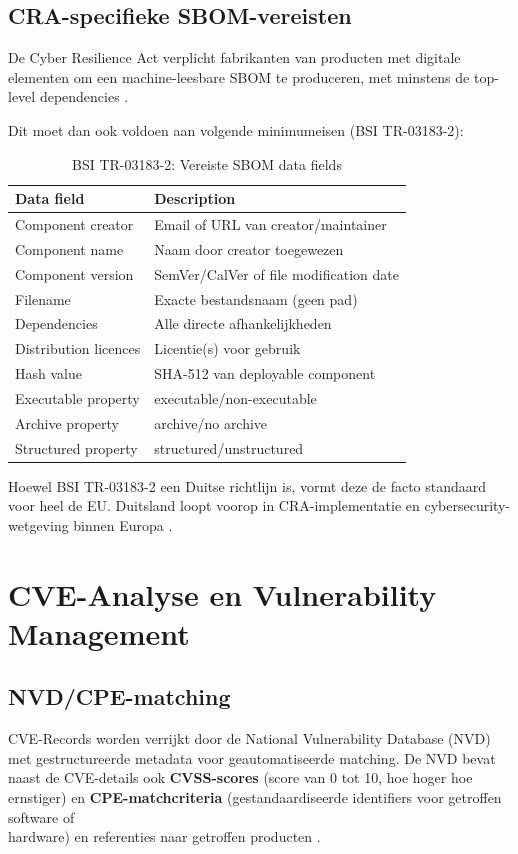 \subsection{CRA-specifieke SBOM-vereisten}

De Cyber Resilience Act verplicht fabrikanten van producten met digitale elementen om een machine-leesbare SBOM te produceren, met minstens de top-level dependencies \autocite{EU_CRA}.

Dit moet dan ook voldoen aan volgende minimumeisen (BSI TR-03183-2):
\begin{table}[H]
  \centering
  \caption{BSI TR-03183-2: Vereiste SBOM data fields \autocite{BSI2025}}
  \begin{tabular}{|p{4.2cm}|p{8cm}|}
    \hline
    \textbf{Data field} & \textbf{Description} \\
    \hline
    Component creator & Email of URL van creator/maintainer \\
    Component name & Naam door creator toegewezen \\
    Component version & SemVer/CalVer of file modification date \\
    Filename & Exacte bestandsnaam (geen pad) \\
    Dependencies & Alle directe afhankelijkheden \\
    Distribution licences & Licentie(s) voor gebruik \\
    Hash value & SHA-512 van deployable component \\
    Executable property & executable/non-executable \\
    Archive property & archive/no archive \\
    Structured property & structured/unstructured \\
    \hline
  \end{tabular}
  \label{tab:cra-sbom-fields}
\end{table}
  
Hoewel BSI TR-03183-2 een Duitse richtlijn is, vormt deze de facto standaard voor heel de EU. Duitsland loopt voorop in CRA-implementatie en cybersecurity-\\wetgeving binnen Europa \autocite{Robyn2025}.

\section{CVE-Analyse en Vulnerability Management}
\subsection{NVD/CPE-matching}
CVE-Records worden verrijkt door de National Vulnerability Database (NVD) met gestructureerde metadata voor geautomatiseerde matching. De NVD bevat naast de CVE-details ook \textbf{CVSS-scores} (score van 0 tot 10, hoe hoger hoe ernstiger) en \textbf{CPE-matchcriteria} (gestandaardiseerde identifiers voor getroffen software of\\hardware) en referenties naar getroffen producten \autocite{NVD_API}.

